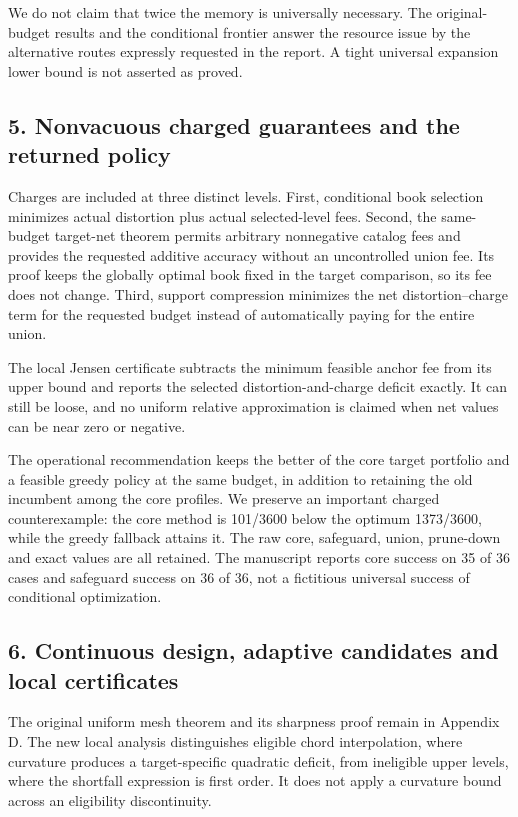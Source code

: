 \documentclass[11pt,letterpaper]{article}
\begin{document}
We do not claim that twice the memory is universally necessary. The original-budget results and the conditional frontier answer the resource issue by the alternative routes expressly requested in the report. A tight universal expansion lower bound is not asserted as proved.



\subsection*{5. Nonvacuous charged guarantees and the returned policy}


Charges are included at three distinct levels. First, conditional book selection minimizes actual distortion plus actual selected-level fees. Second, the same-budget target-net theorem permits arbitrary nonnegative catalog fees and provides the requested additive accuracy without an uncontrolled union fee. Its proof keeps the globally optimal book fixed in the target comparison, so its fee does not change. Third, support compression minimizes the net distortion--charge term for the requested budget instead of automatically paying for the entire union.



The local Jensen certificate subtracts the minimum feasible anchor fee from its upper bound and reports the selected distortion-and-charge deficit exactly. It can still be loose, and no uniform relative approximation is claimed when net values can be near zero or negative.



The operational recommendation keeps the better of the core target portfolio and a feasible greedy policy at the same budget, in addition to retaining the old incumbent among the core profiles. We preserve an important charged counterexample: the core method is 101/3600 below the optimum 1373/3600, while the greedy fallback attains it. The raw core, safeguard, union, prune-down and exact values are all retained. The manuscript reports core success on 35 of 36 cases and safeguard success on 36 of 36, not a fictitious universal success of conditional optimization.



\subsection*{6. Continuous design, adaptive candidates and local certificates}


The original uniform mesh theorem and its sharpness proof remain in Appendix D. The new local analysis distinguishes eligible chord interpolation, where curvature produces a target-specific quadratic deficit, from ineligible upper levels, where the shortfall expression is first order. It does not apply a curvature bound across an eligibility discontinuity.
\end{document}
